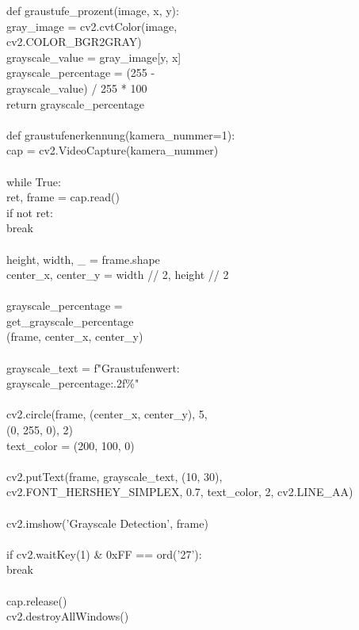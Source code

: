 {def graustufe\_prozent(image, x, y):\\
gray\_image = cv2.cvtColor(image,\\ cv2.COLOR\_BGR2GRAY)\\
grayscale\_value = gray\_image[y, x]\\
grayscale\_percentage = (255 -\\ grayscale\_value) / 255 * 100\\
return grayscale\_percentage\\
\\
def graustufenerkennung(kamera\_nummer=1):\\
cap = cv2.VideoCapture(kamera\_nummer)\\
\\
while True:\\
ret, frame = cap.read()\\
if not ret:\\
break\\
\\
height, width, \_ = frame.shape\\
center\_x, center\_y = width // 2, height // 2\\
\\
grayscale\_percentage =\\ get\_grayscale\_percentage\\
(frame, center\_x, center\_y)\\
\\
grayscale\_text = f"Graustufenwert:\\ {grayscale\_percentage:.2f}\%"\\
\\
cv2.circle(frame, (center\_x, center\_y), 5,\\ (0, 255, 0), 2)\\
text\_color = (200, 100, 0)  \\
\\
cv2.putText(frame, grayscale\_text, (10, 30),\\ 
cv2.FONT\_HERSHEY\_SIMPLEX, 0.7, text\_color, 2, cv2.LINE\_AA)\\
\\
cv2.imshow('Grayscale Detection', frame)\\
\\
if cv2.waitKey(1) \& 0xFF == ord('27'):\\
break\\
\\
cap.release()\\
cv2.destroyAllWindows()\\


}
